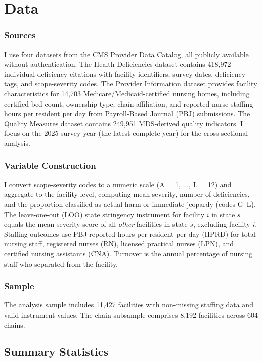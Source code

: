\documentclass[12pt]{article}
\begin{document}
\section{Data}

\subsubsection*{Sources} I use four datasets from the CMS Provider Data Catalog, all publicly available without authentication. The Health Deficiencies dataset contains 418,972 individual deficiency citations with facility identifiers, survey dates, deficiency tags, and scope-severity codes. The Provider Information dataset provides facility characteristics for 14,703 Medicare/Medicaid-certified nursing homes, including certified bed count, ownership type, chain affiliation, and reported nurse staffing hours per resident per day from Payroll-Based Journal (PBJ) submissions. The Quality Measures dataset contains 249,951 MDS-derived quality indicators. I focus on the 2025 survey year (the latest complete year) for the cross-sectional analysis.

\subsubsection*{Variable Construction} I convert scope-severity codes to a numeric scale (A = 1, ..., L = 12) and aggregate to the facility level, computing mean severity, number of deficiencies, and the proportion classified as actual harm or immediate jeopardy (codes G--L). The leave-one-out (LOO) state stringency instrument for facility $i$ in state $s$ equals the mean severity score of all \textit{other} facilities in state $s$, excluding facility $i$. Staffing outcomes use PBJ-reported hours per resident per day (HPRD) for total nursing staff, registered nurses (RN), licensed practical nurses (LPN), and certified nursing assistants (CNA). Turnover is the annual percentage of nursing staff who separated from the facility.

\subsubsection*{Sample} The analysis sample includes 11,427 facilities with non-missing staffing data and valid instrument values. The chain subsample comprises 8,192 facilities across 604 chains.

\subsection{Summary Statistics}
\end{document}

